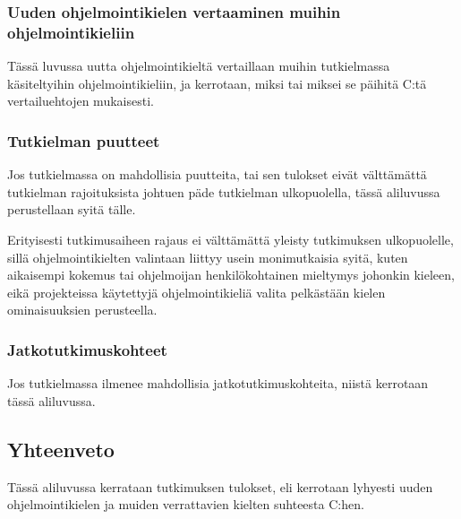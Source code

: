 \subsubsection[Uuden ohjelmointikielen vertaaminen muihin ohjelmointikieliin]
{Uuden ohjelmointikielen vertaaminen muihin \\ ohjelmointikieliin}

Tässä luvussa uutta ohjelmointikieltä vertaillaan muihin tutkielmassa
käsiteltyihin ohjelmointikieliin, ja kerrotaan, miksi tai miksei se päihitä
C:tä vertailuehtojen mukaisesti.

\subsubsection{Tutkielman puutteet}

Jos tutkielmassa on mahdollisia puutteita, tai sen tulokset eivät välttämättä
tutkielman rajoituksista johtuen päde tutkielman ulkopuolella, tässä aliluvussa
perustellaan syitä tälle.

Erityisesti tutkimusaiheen rajaus ei välttämättä yleisty tutkimuksen
ulkopuolelle, sillä ohjelmointikielten valintaan liittyy usein monimutkaisia
syitä, kuten aikaisempi kokemus tai ohjelmoijan henkilökohtainen mieltymys
johonkin kieleen, eikä projekteissa käytettyjä ohjelmointikieliä valita
pelkästään kielen ominaisuuksien perusteella.

\subsubsection{Jatkotutkimuskohteet}

Jos tutkielmassa ilmenee mahdollisia jatkotutkimuskohteita, niistä kerrotaan
tässä aliluvussa.

\subsection{Yhteenveto}

Tässä aliluvussa kerrataan tutkimuksen tulokset, eli kerrotaan lyhyesti uuden
ohjelmointikielen ja muiden verrattavien kielten suhteesta C:hen.

%
%
